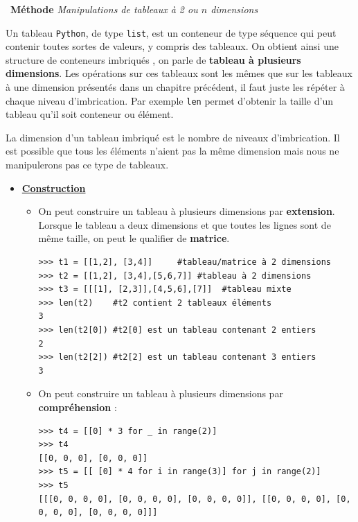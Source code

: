 \documentclass[a4paper, french, 12pt]{article}
\newenvironment{methode}[1]
{\par \medskip    \noindent  
 \begin {bclogo}[arrondi =0.1,logo=\bcoutil, marge=4,noborder = true] {~\textbf{Méthode}   {\itshape #1} }  \par}
{
\end{bclogo}
 \par \bigskip }
\begin{document}
\begin{methode}{Manipulations de tableaux à 2 ou $n$ dimensions}

Un tableau \texttt{Python}, de type \texttt{list}, est un conteneur de type séquence qui peut contenir toutes sortes de valeurs, y compris des tableaux. On obtient ainsi une structure de conteneurs imbriqués , on parle de \textbf{tableau à plusieurs dimensions}. Les opérations sur ces tableaux sont les mêmes que sur les tableaux à une dimension présentés dans un chapitre précédent, il faut juste les répéter à chaque niveau d'imbrication. Par exemple \texttt{len} permet d'obtenir la taille d'un tableau qu'il soit conteneur ou élément.

La dimension d'un tableau imbriqué est le nombre de niveaux d'imbrication. Il est possible que tous les éléments n'aient pas la même dimension mais nous ne manipulerons pas ce type de tableaux. 


\begin{itemize}

\item \underline{\textbf{Construction}}

\begin{itemize}

 \item On peut construire un tableau à plusieurs dimensions par \textbf{extension}. Lorsque le tableau a deux dimensions et que toutes les lignes sont de même taille, on peut le qualifier de \textbf{matrice}. 
 
\begin{lstlisting}[style=compil]
>>> t1 = [[1,2], [3,4]]     #tableau/matrice à 2 dimensions
>>> t2 = [[1,2], [3,4],[5,6,7]] #tableau à 2 dimensions
>>> t3 = [[[1], [2,3]],[4,5,6],[7]]  #tableau mixte 
>>> len(t2)    #t2 contient 2 tableaux éléments
3
>>> len(t2[0]) #t2[0] est un tableau contenant 2 entiers
2
>>> len(t2[2]) #t2[2] est un tableau contenant 3 entiers
3

\end{lstlisting}

\item On peut construire un tableau à plusieurs dimensions par \textbf{compréhension} :

\begin{lstlisting}[style=compil]
>>> t4 = [[0] * 3 for _ in range(2)]
>>> t4
[[0, 0, 0], [0, 0, 0]]
>>> t5 = [[ [0] * 4 for i in range(3)] for j in range(2)]
>>> t5
[[[0, 0, 0, 0], [0, 0, 0, 0], [0, 0, 0, 0]], [[0, 0, 0, 0], [0, 0, 0, 0], [0, 0, 0, 0]]]
\end{lstlisting}



\end{itemize}
\end{itemize}
\end{methode}
\end{document}
